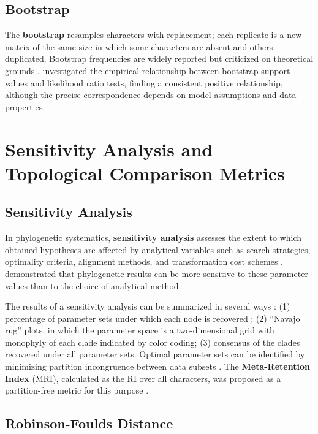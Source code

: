 \subsection{Bootstrap}

The \textbf{bootstrap} \parencite{felsenstein1985} resamples characters with replacement; each replicate is a new matrix of the same size in which some characters are absent and others duplicated. Bootstrap frequencies are widely reported but criticized on theoretical grounds \parencite{farrisetal1996}. \textcite{jacobmachado2021d} investigated the empirical relationship between bootstrap support values and likelihood ratio tests, finding a consistent positive relationship, although the precise correspondence depends on model assumptions and data properties.

\section{Sensitivity Analysis and Topological Comparison Metrics}
\label{sec:metricas}

\subsection{Sensitivity Analysis}

In phylogenetic systematics, \textbf{sensitivity analysis} assesses the extent to which obtained hypotheses are affected by analytical variables such as search strategies, optimality criteria, alignment methods, and transformation cost schemes \parencite{machado2015,wheeler1995}. \textcite{morrisonellis1997} demonstrated that phylogenetic results can be more sensitive to these parameter values than to the choice of analytical method.

The results of a sensitivity analysis can be summarized in several ways \parencite{wheeleretal2006}: (1) percentage of parameter sets under which each node is recovered \parencite{giribetetal2001}; (2) ``Navajo rug'' plots, in which the parameter space is a two-dimensional grid with monophyly of each clade indicated by color coding; (3) consensus of the clades recovered under all parameter sets. Optimal parameter sets can be identified by minimizing partition incongruence between data subsets \parencite{wheeleretal2006}. The \textbf{Meta-Retention Index} (MRI), calculated as the RI over all characters, was proposed as a partition-free metric for this purpose \parencite{wheeleretal2006}.

\subsection{Robinson-Foulds Distance}

